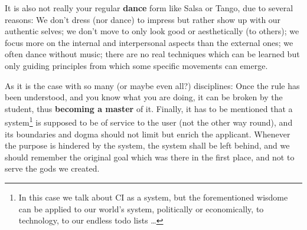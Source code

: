 It is also not really your regular \textbf{dance} form like Salsa or Tango, due to several reasons: We don't dress (nor dance) to impress but rather show up with our authentic selves; we don't move to only look good or aesthetically (to others); we focus more on the internal and interpersonal aspects than the external ones; we often dance without music; there are no real techniques which can be learned but only guiding principles from which some specific movements can emerge.

As it is the case with so many (or maybe even all?) disciplines: Once the rule has been understood, and you know what you are doing, it can be broken by the student, thus \textbf{becoming a master} of it.
Finally, it has to be mentioned that a system\footnote{In this case we talk about CI as a system, but the forementioned wisdome can be applied to our world's system, politically or economically, to technology, to our endless todo lists \ldots} is supposed to be of service to the user (not the other way round), and its boundaries and dogma should not limit but enrich the applicant.
Whenever the purpose is hindered by the system, the system shall be left behind, and we should remember the original goal which was there in the first place, and not to serve the gods we created.
